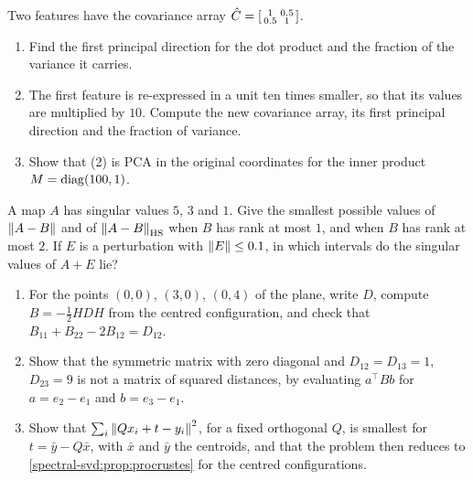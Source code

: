 \begin{notechapter}
\begin{exercise}\label{spectral-svd:exr:8}
Two features have the covariance array
$\hat C = \begin{bsmallmatrix}1 & 0.5\\0.5 & 1\end{bsmallmatrix}$.
\begin{enumerate}[nosep]
  \item Find the first principal direction for the dot product and the
        fraction of the variance it carries.
  \item The first feature is re-expressed in a unit ten times smaller, so
        that its values are multiplied by $10$. Compute the new covariance
        array, its first principal direction and the fraction of variance.
  \item Show that (2) is PCA in the original coordinates for the inner
        product $M = \operatorname{diag}(100, 1)$.
\end{enumerate}
\end{exercise}

\begin{exercise}\label{spectral-svd:exr:9}
A map $A$ has singular values $5$, $3$ and $1$. Give the smallest
possible values of $\left\|A - B\right\|$ and of $\left\|A - B\right\|_{\mathrm{HS}}$ when
$B$ has rank at most $1$, and when $B$ has rank at most $2$. If $E$ is a
perturbation with $\left\|E\right\|\leq0.1$, in which intervals do the singular
values of $A + E$ lie?
\end{exercise}

\begin{exercise}\label{spectral-svd:exr:10}
\begin{enumerate}[nosep]
  \item For the points $(0, 0)$, $(3, 0)$, $(0, 4)$ of the plane,
        write $D$, compute $B = -\frac12HDH$ from the centred
        configuration, and check that
        $B_{11} + B_{22} - 2B_{12} = D_{12}$.
  \item Show that the symmetric matrix with zero diagonal and
        $D_{12} = D_{13} = 1$, $D_{23} = 9$ is not a matrix of squared
        distances, by evaluating $a^\top Bb$ for $a = e_2 - e_1$ and
        $b = e_3 - e_1$.
  \item Show that $\sum_i\left\|Qx_i + t - y_i\right\|^2$, for a fixed
        orthogonal $Q$, is smallest for $t = \bar y - Q\bar x$, with
        $\bar x$ and $\bar y$ the centroids, and that the problem then
        reduces to \cref{spectral-svd:prop:procrustes} for the centred
        configurations.
\end{enumerate}
\end{exercise}
\end{notechapter}
